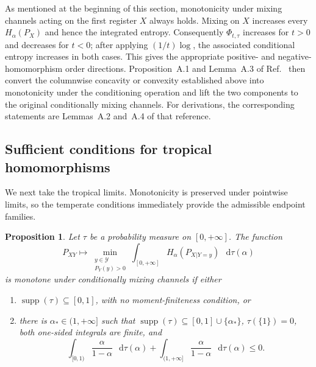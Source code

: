 \documentclass[11pt]{article}
\newtheorem{proposition}[theorem]{Proposition}
\theoremstyle{definition}
\newcommand{\Y}{\mathcal{Y}}
\def\d{\mathop{}\!\mathrm{d}}
\begin{document}
As mentioned at the beginning of this section, monotonicity under mixing channels
acting on the first register $X$ always holds.  Mixing on $X$ increases every
$H_\alpha(P_X)$ and hence the integrated entropy.  Consequently
$\Phi_{t,\tau}$ increases for $t>0$ and decreases for $t<0$; after applying
$(1/t)\log$, the associated conditional entropy increases in both cases.  This
gives the appropriate positive- and negative-homomorphism order directions.
Proposition~A.1 and
Lemma~A.3 of Ref.~\cite{rubboli2026complete} then convert the columnwise
concavity or convexity established above into monotonicity under the conditioning
operation and lift the two components to the original conditionally mixing
channels.  For derivations, the corresponding statements are Lemmas~A.2 and~A.4
of that reference.

\subsection{Sufficient conditions for tropical homomorphisms}

We next take the tropical limits.  Monotonicity is preserved under pointwise
limits, so the temperate conditions immediately provide the admissible endpoint
families.

\begin{proposition}
\label{prop:sufficient-tropical}
Let $\tau$ be a probability measure on $[0,+\infty]$.  The function
\begin{equation}
\label{eq:TropicalForm}
P_{XY}\longmapsto
\min_{\substack{y\in\Y\\P_Y(y)>0}}
\int_{[0,+\infty]}H_\alpha(P_{X|Y=y})\,\d\tau(\alpha)
\end{equation}
is monotone under conditionally mixing channels if either
\begin{enumerate}[label=(\alph*)]
\item $\operatorname{supp}(\tau)\subseteq[0,1]$, with no moment-finiteness
condition, or
\item there is $\alpha_*\in(1,+\infty]$ such that
$\operatorname{supp}(\tau)\subseteq[0,1]\cup\{\alpha_*\}$,
$\tau(\{1\})=0$, both one-sided integrals are finite, and
\begin{equation}
\int_{[0,1)}\frac{\alpha}{1-\alpha}\,\d\tau(\alpha)
+\int_{(1,+\infty]}\frac{\alpha}{1-\alpha}\,\d\tau(\alpha)\leq0.
\end{equation}
\end{enumerate}
\end{proposition}
\end{document}
